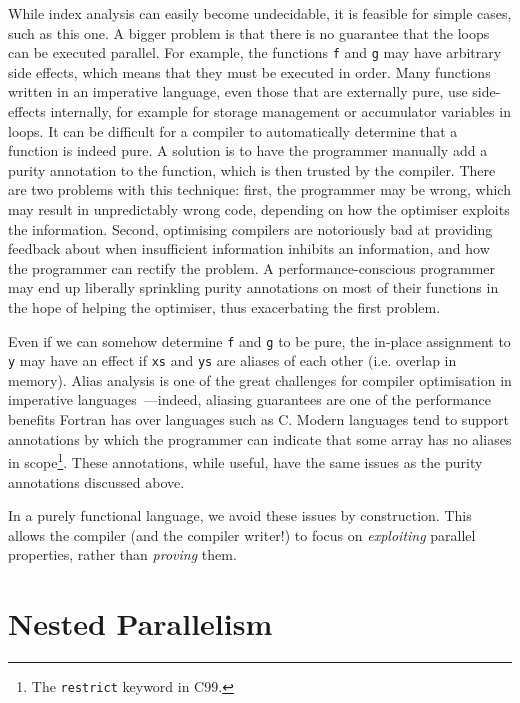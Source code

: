 While index analysis can easily become undecidable, it is feasible for
simple cases, such as this one.  A bigger problem is that there is no
guarantee that the loops can be executed parallel.  For example, the
functions \lstinline{f} and \lstinline{g} may have arbitrary side
effects, which means that they must be executed in order.  Many
functions written in an imperative language, even those that are
externally pure, use side-effects internally, for example for storage
management or accumulator variables in loops.  It can be difficult for
a compiler to automatically determine that a function is indeed pure.
A solution is to have the programmer manually add a purity annotation
to the function, which is then trusted by the compiler.  There are two
problems with this technique: first, the programmer may be wrong,
which may result in unpredictably wrong code, depending on how the
optimiser exploits the information.  Second, optimising compilers are
notoriously bad at providing feedback about when insufficient
information inhibits an information, and how the programmer can
rectify the problem.  A performance-conscious programmer may end up
liberally sprinkling purity annotations on most of their functions in
the hope of helping the optimiser, thus exacerbating the first
problem.

Even if we can somehow determine \lstinline{f} and \lstinline{g} to be
pure, the in-place assignment to \lstinline{y} may have an effect if
\lstinline{xs} and \lstinline{ys} are aliases of each other
(i.e. overlap in memory).  Alias analysis is one of the great
challenges for compiler optimisation in imperative
languages~\cite{hendren1992designing}---indeed, aliasing guarantees
are one of the performance benefits Fortran has over languages such as
C.  Modern languages tend to support annotations by which the
programmer can indicate that some array has no aliases in
scope\footnote{The \texttt{restrict} keyword in C99.}.  These
annotations, while useful, have the same issues as the purity
annotations discussed above.

In a purely functional language, we avoid these issues by
construction.  This allows the compiler (and the compiler writer!) to
focus on \textit{exploiting} parallel properties, rather than
\textit{proving} them.

\section{Nested Parallelism}
\label{sec:nested-parallelism}

